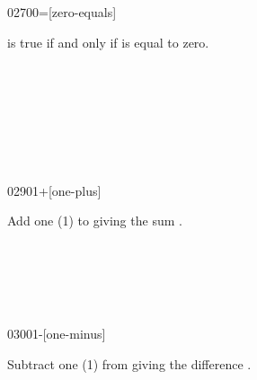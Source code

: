 \vspace*{-2ex}
\begin{worddef}{0270}{0=}[zero-equals]
\item {}

	 is true if and only if  is equal to zero.

	\begin{testing} %
		 \\
		 \\
		 \\
		 \\
		 \\
		 \\
	\end{testing}
\end{worddef}

\vspace*{-2ex}
\begin{worddef}{0290}{1+}[one-plus]
\item {}

	Add one (1) to  giving the sum
	.

	\begin{testing} %
		 \\
		 \\
		 \\
		 \\
	\end{testing}
\end{worddef}


\begin{worddef}{0300}{1-}[one-minus]
\item {}

	Subtract one (1) from  giving the difference
	.

	\begin{testing} %
		 \\
		 \\
		 \\
	\end{testing}
\end{worddef}


